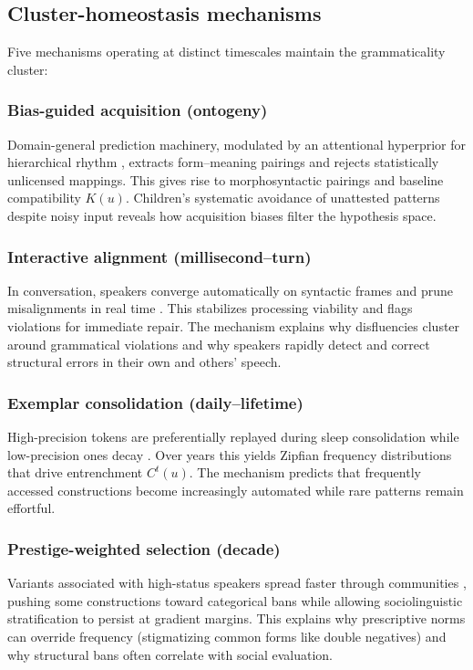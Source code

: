\documentclass[12pt]{article}
\begin{document}
\subsection{Cluster-homeostasis mechanisms}
Five mechanisms operating at distinct timescales maintain the grammaticality cluster:

\subsubsection{Bias-guided acquisition (ontogeny)}
    Domain-general prediction machinery, modulated by an attentional hyperprior for hierarchical rhythm \parencite{ReynoldsEcho}, extracts form--meaning pairings and rejects statistically unlicensed mappings. This gives rise to morphosyntactic pairings and baseline compatibility $K(u)$. Children's systematic avoidance of unattested patterns despite noisy input reveals how acquisition biases filter the hypothesis space.

\subsubsection{Interactive alignment (millisecond–turn)}
    In conversation, speakers converge automatically on syntactic frames and prune misalignments in real time \parencite{PickeringGarrod2004}. This stabilizes processing viability and flags violations for immediate repair. The mechanism explains why disfluencies cluster around grammatical violations and why speakers rapidly detect and correct structural errors in their own and others' speech.

\subsubsection{Exemplar consolidation (daily–lifetime)}
    High-precision tokens are preferentially replayed during sleep consolidation while low-precision ones decay \parencite{Mirkovic2016}. Over years this yields Zipfian frequency distributions that drive entrenchment $C^t(u)$. The mechanism predicts that frequently accessed constructions become increasingly automated while rare patterns remain effortful.

\subsubsection{Prestige-weighted selection (decade)}
    Variants associated with high-status speakers spread faster through communities \parencite{labov2001,eckert2000}, pushing some constructions toward categorical bans while allowing sociolinguistic stratification to persist at gradient margins. This explains why prescriptive norms can override frequency (stigmatizing common forms like double negatives) and why structural bans often correlate with social evaluation.
\end{document}
